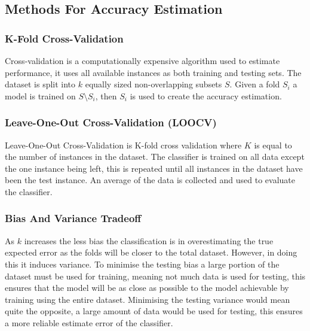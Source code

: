 \documentclass{cmppgr}
\begin{document}
\subsection{Methods For Accuracy Estimation}







\subsubsection{K-Fold Cross-Validation}
Cross-validation is a computationally expensive algorithm used to estimate performance, it uses all available instances as both training and testing sets. The dataset is split into $k$ equally sized non-overlapping subsets $S$. Given a fold $S_i$ a model is trained on $S \setminus S_i$, then $S_i$ is used to create the accuracy estimation.

\subsubsection{Leave-One-Out Cross-Validation (LOOCV)}
Leave-One-Out Cross-Validation is  K-fold cross validation where $K$ is equal to the number of instances in the dataset. The classifier is trained on all data except the one instance being left, this is repeated until all instances in the dataset have been the test instance. An average of the data is collected and used to evaluate the classifier.

\subsubsection{Bias And Variance Tradeoff}
As $k$ increases the less bias the classification is in overestimating the true expected error as the folds will be closer to the total dataset. However, in doing this it induces variance. To minimise the testing bias a large portion of the dataset must be used for training, meaning not much data is used for testing, this ensures that the model will be as close as possible to the model achievable by training using the entire dataset. Minimising the testing variance would mean quite the opposite, a large amount of data would be used for testing, this ensures a more reliable estimate error of the classifier.
\end{document}
